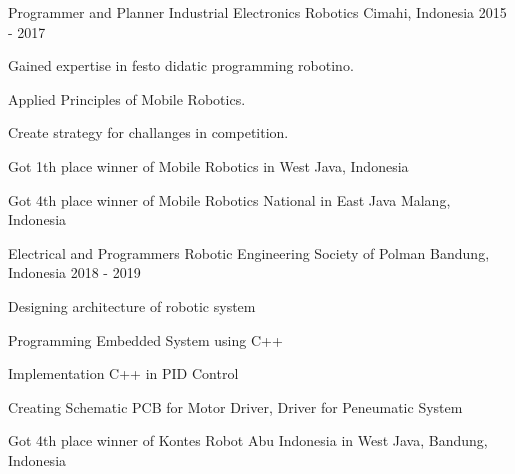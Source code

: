 

\begin{cventries}

  \cventry
    {Programmer and Planner} %
    {Industrial Electronics Robotics} %
    {Cimahi, Indonesia} %
    {2015 - 2017} %
    {
      \begin{cvitems} %
        \item {Gained expertise in festo didatic programming robotino.}
        \item {Applied Principles of Mobile Robotics.}
        \item {Create strategy for challanges in competition.}
        \item {Got 1th place winner of Mobile Robotics in West Java, Indonesia}
        \item {Got 4th place winner of Mobile Robotics National in East Java Malang, Indonesia}
      \end{cvitems}
    }

  \cventry
    {Electrical and Programmers} %
    {Robotic Engineering Society of Polman} %
    {Bandung, Indonesia} %
    {2018 - 2019} %
    {
      \begin{cvitems} %
        \item {Designing architecture of robotic system}
        \item {Programming Embedded System using C++}
        \item {Implementation C++ in PID Control}
        \item {Creating Schematic PCB for Motor Driver, Driver for Peneumatic System}
        \item {Got 4th place winner of Kontes Robot Abu Indonesia in West Java, Bandung, Indonesia}
      \end{cvitems}
    }

\end{cventries}
